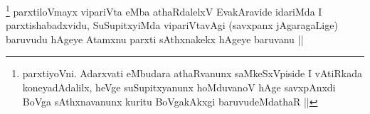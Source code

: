 
\begin{artha}
\footnote[3]{parxtiyoVni. Adarxvati eMbudara athaRvanunx saMkeSxVpiside I vAtiRkada koneyadAdalilx, heVge suSupitxyanunx hoMduvanoV hAge savxpAnxdi BoVga sAthxnavanunx kuritu BoVgakAkxgi baruvudeMdathaR ||}
parxtiloVmayx vipariVta eMba athaRdalelxV EvakAravide idariMda I parxtishabadxvidu, SuSupitxyiMda vipariVtavAgi (savxpanx jAgaragaLige) baruvudu hAgeye Atamxnu parxti sAthxnakekx hAgeye baruvanu ||
\end{artha}

